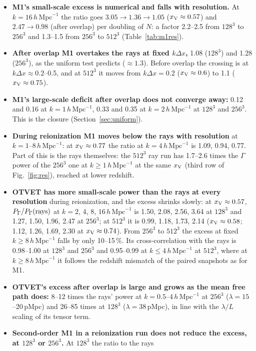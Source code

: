 \documentclass[11pt]{article}
\newcommand{\hmpc}{\,h\,\mathrm{Mpc}^{-1}}
\newcommand{\xv}{x_{\rm V}}
\newcommand{\dx}{\Delta x}
\begin{document}
\begin{itemize}
\item \textbf{M1's small-scale excess is numerical and falls with resolution.} At $k=16\hmpc$ the ratio
goes $3.05\to1.36\to1.05$ ($\xv\approx0.57$) and $2.47\to0.98$ (after overlap) per doubling of $N$: a factor
2.2--2.5 from $128^3$ to $256^3$ and 1.3--1.5 from $256^3$ to $512^3$ (Table~\ref{tab:m1res}).
\item \textbf{After overlap M1 overtakes the rays at fixed $k\dx$,} 1.08 ($128^3$) and 1.28 ($256^3$), as the
uniform test predicts ($\approx1.3$). Before overlap the crossing is at $k\dx\approx0.2$--0.5, and at $512^3$ it moves from $k\dx=0.2$
($\xv\approx0.6$) to 1.1 ($\xv\approx0.75$).
\item \textbf{M1's large-scale deficit after overlap does not converge away:} 0.12 and 0.16 at $k=1\hmpc$,
0.33 and 0.35 at $k=2\hmpc$ at $128^3$ and $256^3$. This is the closure (Section~\ref{sec:uniform}).
\item \textbf{During reionization M1 moves below the rays with resolution} at $k=1$--$8\hmpc$: at
$\xv\approx0.77$ the ratio at $k=4\hmpc$ is 1.09, 0.94, 0.77. Part of this is the rays themselves: the $512^3$ ray run has
1.7--2.6 times the $\Gamma$ power of the $256^3$ one at $k\ge1\hmpc$ at the same $\xv$ (third row of
Fig.~\ref{fig:res}), reached at lower redshift.
\item \textbf{OTVET has more small-scale power than the rays at every resolution} during reionization, and the
excess shrinks slowly: at $\xv\approx0.57$, $P_\Gamma/P_\Gamma({\rm rays})$ at $k=2$, 4, 8, $16\hmpc$ is
1.50, 2.08, 2.56, 3.64 at $128^3$ and 1.27, 1.50, 1.96, 2.47 at $256^3$; at $512^3$ it is
0.99, 1.18, 1.73, 2.14 ($\xv\approx0.58$; 1.12, 1.26, 1.69, 2.30 at $\xv\approx0.74$). From $256^3$ to
$512^3$ the excess at fixed $k\ge8\hmpc$ falls by only 10--15\,\%. Its cross-correlation with the rays is
0.98--1.00 at $128^3$ and $256^3$ and 0.95--0.99 at $k\le4\hmpc$ at $512^3$, where at $k\ge8\hmpc$ it follows
the redshift mismatch of the paired snapshots as for M1.
\item \textbf{OTVET's excess after overlap is large and grows as the mean free path does:} 8--12 times the
rays' power at $k=0.5$--$4\hmpc$ at $256^3$ ($\lambda=15$--20\,pMpc) and 26--85 times at $128^3$
($\lambda=38$\,pMpc), in line with the $\lambda/L$ scaling of its tensor term.
\item \textbf{Second-order M1 in a reionization run does not reduce the excess, at $128^3$ or $256^3$.} At
$128^3$ the ratio to the rays

\end{itemize}
\end{document}
